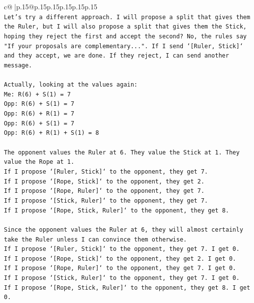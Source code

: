 \documentclass{article}
\begin{document}
{\begin{supertabular}{c@{$\;$}|p{.15\linewidth}@{}p{.15\linewidth}p{.15\linewidth}p{.15\linewidth}p{.15\linewidth}p{.15\linewidth}}
{{{\\ 
\texttt{Let's try a different approach. I will propose a split that gives them the Ruler, but I will also propose a split that gives them the Stick, hoping they reject the first and accept the second? No, the rules say "If your proposals are complementary...". If I send `{[}Ruler, Stick{]}` and they accept, we are done. If they reject, I can send another message.} \\
\\ 
\texttt{Actually, looking at the values again:} \\
\texttt{Me: R(6) + S(1) = 7} \\
\texttt{Opp: R(6) + S(1) = 7} \\
\texttt{Opp: R(6) + R(1) = 7} \\
\texttt{Opp: R(6) + S(1) = 7} \\
\texttt{Opp: R(6) + R(1) + S(1) = 8} \\
\\ 
\texttt{The opponent values the Ruler at 6. They value the Stick at 1. They value the Rope at 1.} \\
\texttt{If I propose `{[}Ruler, Stick{]}` to the opponent, they get 7.} \\
\texttt{If I propose `{[}Rope, Stick{]}` to the opponent, they get 2.} \\
\texttt{If I propose `{[}Rope, Ruler{]}` to the opponent, they get 7.} \\
\texttt{If I propose `{[}Stick, Ruler{]}` to the opponent, they get 7.} \\
\texttt{If I propose `{[}Rope, Stick, Ruler{]}` to the opponent, they get 8.} \\
\\ 
\texttt{Since the opponent values the Ruler at 6, they will almost certainly take the Ruler unless I can convince them otherwise.} \\
\texttt{If I propose `{[}Ruler, Stick{]}` to the opponent, they get 7. I get 0.} \\
\texttt{If I propose `{[}Rope, Stick{]}` to the opponent, they get 2. I get 0.} \\
\texttt{If I propose `{[}Rope, Ruler{]}` to the opponent, they get 7. I get 0.} \\
\texttt{If I propose `{[}Stick, Ruler{]}` to the opponent, they get 7. I get 0.} \\
\texttt{If I propose `{[}Rope, Stick, Ruler{]}` to the opponent, they get 8. I get 0.} \\
\\ 
}}}
\end{supertabular}}
\end{document}
